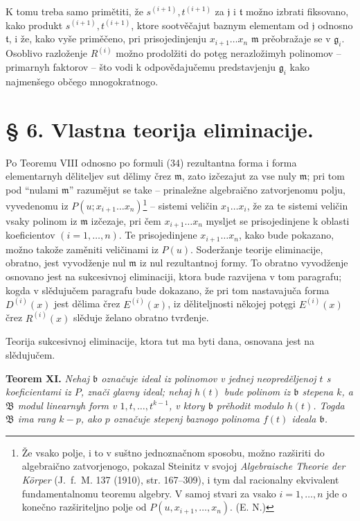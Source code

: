 \documentclass[11pt]{article}
\providecommand{\Bmod}{\mathfrak B}
\providecommand{\mideal}{\mathfrak m}
\providecommand{\gideal}{\mathfrak g}
\providecommand{\jideal}{\mathfrak j}
\providecommand{\tideal}{\mathfrak t}
\providecommand{\bideal}{\mathfrak b}
\begin{document}
K tomu treba samo primětiti, že $s^{(i+1)},t^{(i+1)}$ za $\jideal$ i $\tideal$ možno izbrati fiksovano, kako produkt $s^{(i+1)},t^{(i+1)}$, ktore sootvěčajut baznym elementam od $\jideal$ odnosno $\tideal$, i že, kako vyše priměčeno, pri prisojedinjenju $x_{i+1}\ldots x_n$ $\mideal$ prěobražaje se v $\gideal_i$. Osoblivo razloženje $R^{(i)}$ možno prodolžiti do potęg nerazložimyh polinomov -- primarnyh faktorov -- što vodi k odpovědajučemu predstavjenju $\gideal_i$ kako najmenšego občego mnogokratnogo.

\clearpage
\section*{§ 6. Vlastna teorija eliminacije.}

Po Teoremu VIII odnosno po formuli (34) rezultantna forma i forma elementarnyh děliteljev sut dělimy črez $\mideal$, zato izčezajut za vse nuly $\mideal$; pri tom pod ``nulami $\mideal$'' razumějut se take -- prinaležne algebraično zatvorjenomu polju, vyvedenomu iz $P(u;x_{i+1}\ldots x_n)$\footnote{Že vsako polje, i to v suštno jednoznačnom sposobu, možno razširiti do algebraično zatvorjenogo, pokazal \mbox{Steinitz} v svojoj \emph{Algebraische Theorie der Körper} (\mbox{J. f. M.} 137 (1910), str. 167--309), i tym dal racionalny ekvivalent fundamentalnomu teoremu algebry. V samoj stvari za vsako $i=1,\ldots,n$ jde o konečno razširiteljno polje od $P(u,x_{i+1},\ldots,x_n)$. (E. N.)} -- sistemi veličin $x_1\ldots x_i$, že za te sistemi veličin vsaky polinom iz $\mideal$ izčezaje, pri čem $x_{i+1}\ldots x_n$ mysljet se prisojedinjene k oblasti koeficientov $(i=1,\ldots,n)$. Te prisojedinjene $x_{i+1}\ldots x_n$, kako bude pokazano, možno takože zaměniti veličinami iz $P(u)$. Soderžanje teorije eliminacije, obratno, jest vyvodženje nul $\mideal$ iz nul rezultantnoj formy. To obratno vyvodženje osnovano jest na sukcesivnoj eliminaciji, ktora bude razvijena v tom paragrafu; kogda v slědujučem paragrafu bude dokazano, že pri tom nastavajuča forma $D^{(i)}(x)$ jest dělima črez $E^{(i)}(x)$, iz děliteljnosti někojej potęgi $E^{(i)}(x)$ črez $R^{(i)}(x)$ slěduje želano obratno tvrđenje.

Teorija sukcesivnoj eliminacije, ktora tut ma byti dana, osnovana jest na slědujučem.

\medskip
\noindent\textbf{Teorem XI.} {\itshape Nehaj $\bideal$ označuje ideal iz polinomov v jednej neopreděljenoj $t$ s koeficientami iz $P$, znači glavny ideal; nehaj $h(t)$ bude polinom iz $\bideal$ stepena $k$, a $\Bmod$ modul linearnyh form v $1,t,\ldots,t^{k-1}$, v ktory $\bideal$ prěhodit modulo $h(t)$. Togda $\Bmod$ ima rang $k-p$, ako $p$ označuje stepenj baznogo polinoma $f(t)$ ideala $\bideal$.}
\end{document}
